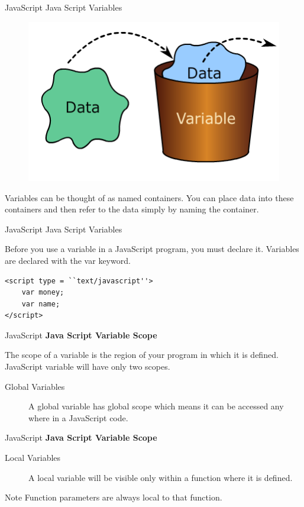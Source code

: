 \documentclass[14pt]{beamer}
\begin{document}
\begin{frame}{JavaScript}
Java Script Variables
\begin{figure}[H]
\centering
\includegraphics[scale=.25]{js-variables.png}
\end{figure}
Variables can be thought of as named containers. You can place data into these containers and then refer to the data simply by naming the container.
\end{frame}

\begin{frame}[fragile]{JavaScript}
Java Script Variables

\vspace{1pc}
Before you use a variable in a JavaScript program, you must declare it. Variables are declared with the var keyword.
\begin{block}{}
\begin{lstlisting}
<script type = ``text/javascript''>
    var money;
    var name;
</script>
\end{lstlisting}
\end{block}
\end{frame}

\begin{frame}{JavaScript}
\textbf{Java Script Variable Scope}

\vspace{1pc}
The scope of a variable is the region of your program in which it is defined. JavaScript variable will have only two scopes.
\begin{description}
 \item [Global Variables] A global variable has global scope which means it can be accessed any where in a JavaScript code.
\end{description}
\end{frame}

\begin{frame}{JavaScript}
\textbf{Java Script Variable Scope}

\vspace{1pc}
\begin{description}
 \item [Local Variables] A local variable will be visible only within a function where it is defined.
\end{description}
\begin{bclogo}[couleur=blue!5, arrondi=0.3, logo=\bccrayon]{Note}
Function parameters are always local to that function.
\end{bclogo}
\end{frame}
\end{document}
